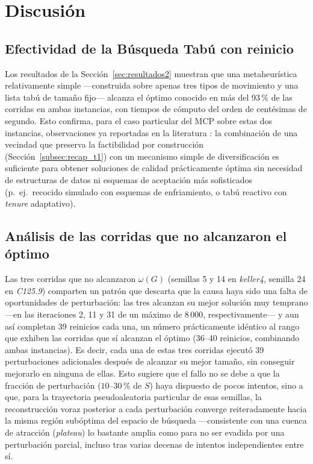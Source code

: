 \section{Discusión}

\subsection{Efectividad de la Búsqueda Tabú con reinicio}

Los resultados de la Sección~\ref{sec:resultados2} muestran que una metaheurística relativamente simple —construida sobre apenas tres tipos de movimiento y una lista tabú de tamaño fijo— alcanza el óptimo conocido en más del 93\,\% de las corridas en ambas instancias, con tiempos de cómputo del orden de centésimas de segundo. Esto confirma, para el caso particular del MCP sobre estas dos instancias, observaciones ya reportadas en la literatura \parencite{battiti2001reactive, pullan2006dynamic}: la combinación de una vecindad que preserva la factibilidad por construcción (Sección~\ref{subsec:recap_t1}) con un mecanismo simple de diversificación es suficiente para obtener soluciones de calidad prácticamente óptima sin necesidad de estructuras de datos ni esquemas de aceptación más sofisticados (p.\ ej.\ recocido simulado con esquemas de enfriamiento, o tabú reactivo con \textit{tenure} adaptativo).

\subsection{Análisis de las corridas que no alcanzaron el óptimo}

Las tres corridas que no alcanzaron $\omega(G)$ (semillas 5 y 14 en \textit{keller4}, semilla 24 en \textit{C125.9}) comparten un patrón que descarta que la causa haya sido una falta de oportunidades de perturbación: las tres alcanzan su mejor solución muy temprano —en las iteraciones 2, 11 y 31 de un máximo de 8\,000, respectivamente— y aun así completan 39 reinicios cada una, un número prácticamente idéntico al rango que exhiben las corridas que sí alcanzan el óptimo (36--40 reinicios, combinando ambas instancias). Es decir, cada una de estas tres corridas ejecutó 39 perturbaciones adicionales después de alcanzar su mejor tamaño, sin conseguir mejorarlo en ninguna de ellas. Esto sugiere que el fallo no se debe a que la fracción de perturbación ($10$--$30\,\%$ de $S$) haya dispuesto de pocos intentos, sino a que, para la trayectoria pseudoaleatoria particular de esas semillas, la reconstrucción voraz posterior a cada perturbación converge reiteradamente hacia la misma región subóptima del espacio de búsqueda —consistente con una cuenca de atracción (\textit{plateau}) lo bastante amplia como para no ser evadida por una perturbación parcial, incluso tras varias decenas de intentos independientes entre sí.

